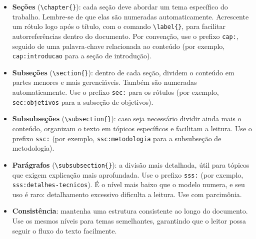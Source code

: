 \begin{itemize}
    \item \textbf{Seções} (\verb|\chapter{}|): cada seção deve abordar um tema específico do trabalho.
          Lembre-se de que elas são numeradas automaticamente. Acrescente um rótulo logo após o título,
          com o comando \verb|\label{}|, para facilitar autorreferências dentro do documento. Por
          convenção, use o prefixo \texttt{cap:}, seguido de uma palavra-chave relacionada ao conteúdo
          (por exemplo, \texttt{cap:introducao} para a seção de introdução).
    \item \textbf{Subseções} (\verb|\section{}|): dentro de cada seção, dividem o conteúdo em partes
          menores e mais gerenciáveis. Também são numeradas automaticamente. Use o prefixo
          \texttt{sec:} para os rótulos (por exemplo, \texttt{sec:objetivos} para a subseção de
          objetivos).
    \item \textbf{Subsubseções} (\verb|\subsection{}|): caso seja necessário dividir ainda mais o
          conteúdo, organizam o texto em tópicos específicos e facilitam a leitura. Use o prefixo
          \texttt{ssc:} (por exemplo, \texttt{ssc:metodologia} para a subsubseção de metodologia).
    \item \textbf{Parágrafos} (\verb|\subsubsection{}|): a divisão mais detalhada, útil para tópicos
          que exigem explicação mais aprofundada. Use o prefixo \texttt{sss:} (por exemplo,
          \texttt{sss:detalhes-tecnicos}). É o nível mais baixo que o modelo numera, e seu uso é raro:
          detalhamento excessivo dificulta a leitura. Use com parcimônia.
    \item \textbf{Consistência}: mantenha uma estrutura consistente ao longo do documento. Use os
          mesmos níveis para temas semelhantes, garantindo que o leitor possa seguir o fluxo do texto
          facilmente.
\end{itemize}

